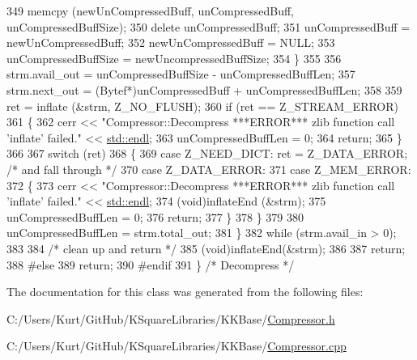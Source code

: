 \begin{DoxyCode}
349       memcpy (newUnCompressedBuff, unCompressedBuff, unCompressedBuffSize);
350       \textcolor{keyword}{delete}  unCompressedBuff;
351       unCompressedBuff = newUnCompressedBuff;
352       newUnCompressedBuff = NULL;
353       unCompressedBuffSize = newUncompressedBuffSize;
354     \}
355 
356     strm.avail\_out = unCompressedBuffSize - unCompressedBuffLen;
357     strm.next\_out  = (Bytef*)unCompressedBuff + unCompressedBuffLen;
358 
359     ret = inflate (&strm, Z\_NO\_FLUSH);
360     \textcolor{keywordflow}{if}  (ret == Z\_STREAM\_ERROR)
361     \{
362       cerr << \textcolor{stringliteral}{"Compressor::Decompress  ***ERROR***  zlib function call 'inflate'  failed."}  << 
      \hyperlink{namespace_k_k_b_ad1f50f65af6adc8fa9e6f62d007818a8}{std::endl};
363       unCompressedBuffLen = 0;
364       \textcolor{keywordflow}{return};
365     \}
366 
367     \textcolor{keywordflow}{switch} (ret) 
368     \{
369     \textcolor{keywordflow}{case} Z\_NEED\_DICT:  ret = Z\_DATA\_ERROR;     \textcolor{comment}{/* and fall through */}
370     \textcolor{keywordflow}{case} Z\_DATA\_ERROR:
371     \textcolor{keywordflow}{case} Z\_MEM\_ERROR:
372       \{
373         cerr << \textcolor{stringliteral}{"Compressor::Decompress  ***ERROR***  zlib function call 'inflate'  failed."}  << 
      \hyperlink{namespace_k_k_b_ad1f50f65af6adc8fa9e6f62d007818a8}{std::endl};
374         (void)inflateEnd (&strm);
375         unCompressedBuffLen = 0;
376         \textcolor{keywordflow}{return};
377       \}
378     \}
379 
380     unCompressedBuffLen = strm.total\_out;
381   \}
382   \textcolor{keywordflow}{while} (strm.avail\_in > 0);
383 
384   \textcolor{comment}{/* clean up and return */}
385   (void)inflateEnd(&strm);
386 
387   \textcolor{keywordflow}{return};
388 \textcolor{preprocessor}{#else}
389   \textcolor{keywordflow}{return};
390 \textcolor{preprocessor}{#endif}
391 \}  \textcolor{comment}{/* Decompress */}
\end{DoxyCode}


The documentation for this class was generated from the following files\+:\begin{DoxyCompactItemize}
\item 
C\+:/\+Users/\+Kurt/\+Git\+Hub/\+K\+Square\+Libraries/\+K\+K\+Base/\hyperlink{_compressor_8h}{Compressor.\+h}\item 
C\+:/\+Users/\+Kurt/\+Git\+Hub/\+K\+Square\+Libraries/\+K\+K\+Base/\hyperlink{_compressor_8cpp}{Compressor.\+cpp}\end{DoxyCompactItemize}
